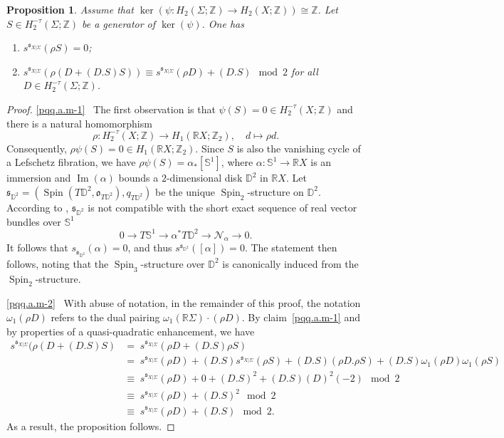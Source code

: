 \documentclass[11pt]{amsart}
\numberwithin{equation}{section}
\theoremstyle{definition}
\theoremstyle{plain}
\newtheorem{proposition}[definition]{Proposition}
\theoremstyle{remark}
\newcommand{\R}{\mathbb{R}}
\newcommand{\Z}{\mathbb{Z}}
\DeclareMathOperator{\Spin}{Spin}
\renewcommand{\Im}{\operatorname{Im}}
\newcommand{\lra}{\longrightarrow}
\begin{document}
\begin{proposition} \label{prop-quasi-quad.and.monodromy}
Assume that $\ker (\psi\colon  H_2(\Sigma;\mathbb{Z})\to H_2(X;\mathbb{Z}))\cong \Z$. Let $S\in H_2^{-\tau}(\Sigma;\Z)$ be a generator of $\ker (\psi)$. 
One has
\begin{enumerate}
    \item\label{pqq.a.m-1} $s^{\mathfrak{s}_{X|\Sigma}}(\rho S)=0$;
    \item\label{pqq.a.m-2} $s^{\mathfrak{s}_{X|\Sigma}}(\rho ({D+(D.S)S})) \equiv s^{\mathfrak{s}_{X|\Sigma}}(\rho D) +(D.S) \mod 2$ 
      for all $D\in H_2^{-\tau }(\Sigma;\Z)$. 
\end{enumerate}
\end{proposition}

\begin{proof}
\eqref{pqq.a.m-1}~
 The first observation is that $\psi  (S)=0\in H_2^{-\tau}(X;\Z)$ and there is a natural homomorphism 
$$\rho\colon  H_2^{-\tau}(X;\Z) \lra H_1(\R X;\Z_2), \quad d\longmapsto \rho d.$$
Consequently,  $\rho \psi (S)=0\in H_1(\R X;\Z_2)$.    Since $S$ is also the vanishing cycle of a Lefschetz fibration, we have $\rho \psi (S)=\alpha_*[\mathbb{S}^1]$, where $\alpha\colon  \mathbb{S}^1\to \R X$ is an immersion and $\Im(\alpha)$ bounds a $2$-dimensional disk $\mathbb{D}^2$ in $\R X$. Let $\mathfrak{s}_{\mathbb{D}^2}=(\Spin(T \mathbb{D}^2,\mathfrak{o}_{T \mathbb{D}^2}),q_{T \mathbb{D}^2})$ be the  unique $\Spin_2$-structure on $\mathbb{D}^2$. According to \cite[Example 11.3]{chen2024spin},  $\mathfrak{s}_{\mathbb{D}^2}$ is not compatible with the short exact sequence of real vector bundles over $\mathbb{S}^1$ 
$$0\lra T \mathbb{S}^1 \lra \alpha^* T \mathbb{D}^2 \lra \mathcal{N}_\alpha \lra 0.$$  
It follows that  $s_{\mathfrak{s}_{\mathbb{D}^2}}(\alpha)=0$, and thus $s^{\mathfrak{s}_{\mathbb{D}^2}}([\alpha])=0$. The statement then follows, noting that the  $\Spin_3$-structure over $\mathbb{D}^2$ is canonically induced from the  $\Spin_2$-structure.

\eqref{pqq.a.m-2}~
With abuse of notation, in the remainder of this proof,  the notation $\omega_1(\rho D)$ refers to the dual pairing $\omega_1(\R \Sigma)\cdot (\rho D)$. By  claim~\eqref{pqq.a.m-1} and by properties of a quasi-quadratic enhancement, we have
\begin{align*}
    s^{\mathfrak{s}_{X|\Sigma}}(\rho (D+(D.S)S)&
      = \; s^{\mathfrak{s}_{X|\Sigma}}(\rho D+(D.S)\rho S)\\
     & =\; s^{\mathfrak{s}_{X|\Sigma}}(\rho D)+(D.S)s^{\mathfrak{s}_{X|\Sigma}}(\rho S)+(D.S)(\rho D. \rho S)+(D.S)\omega_1(\rho D)\omega_1(\rho S)\\
    &\equiv  \; s^{\mathfrak{s}_{X|\Sigma}}(\rho D)+0+(D.S)^2+(D.S)(D)^2(-2) \mod 2\\
    &\equiv  \;s^{\mathfrak{s}_{X|\Sigma}}(\rho D)+(D.S)^2 \mod 2\\
    &\equiv  \; s^{\mathfrak{s}_{X|\Sigma}}(\rho D)+(D.S) \mod 2.
\end{align*} 
As a result, the proposition follows.
\end{proof}
\end{document}
